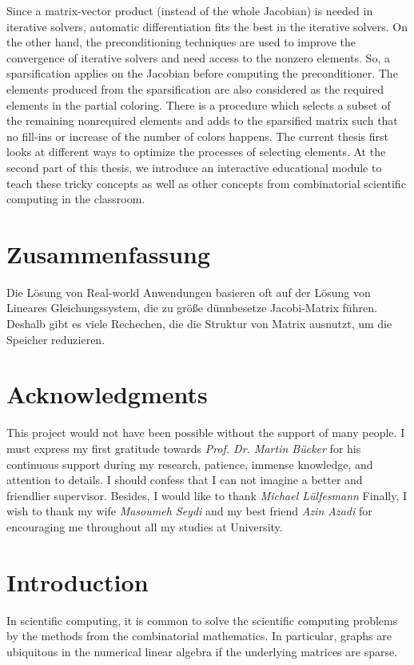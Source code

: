 \documentclass[12pt, twoside,a4paper,toc=bibliography]{scrbook}
\begin{document}
Since a matrix-vector product (instead of the whole Jacobian)
is needed in iterative solvers, automatic differentiation fits
the best in the iterative solvers.
On the other hand, the preconditioning techniques are used to improve the convergence of iterative solvers and need access to the nonzero elements. So, a sparsification applies on the Jacobian before computing the preconditioner. The elements produced from the sparsification are also considered as the required elements in the partial coloring.
There is a procedure which selects a subset of the remaining nonrequired elements and adds to the sparsified matrix such that no fill-ins or increase of the number of colors happens.
The current thesis first looks at different ways to optimize
the processes of selecting elements.
At the second part of this thesis, we introduce an interactive educational module to teach these
tricky concepts as well as other concepts from combinatorial scientific computing in the classroom.

\chapter*{Zusammenfassung}

Die Lösung von Real-world Anwendungen basieren oft auf der Lösung von Lineares Gleichungssystem,
die zu größe dünnbesetze Jacobi-Matrix führen. Deshalb gibt es viele Rechechen, die 
die Struktur von Matrix ausnutzt, um die Speicher reduzieren.


\chapter*{Acknowledgments}
\noindent This project would not have been possible without
the support of many people. I must express my first gratitude
towards \textit{Prof. Dr. Martin B\"ucker} for his continuous
support during my research, patience, immense knowledge,
and attention to details.
I should confess that I can not imagine a better and friendlier supervisor.
Besides, I would like to thank \textit{Michael Lülfesmann}
Finally, I wish to thank my wife \textit{Masoumeh Seydi} and
my best friend \textit{Azin Azadi} for encouraging me throughout all my studies at University.

\tableofcontents
\chapter{Introduction}
In scientific computing, it is common to solve the scientific computing problems by the methods from the combinatorial mathematics. In particular, graphs are ubiquitous in the numerical linear algebra if the underlying matrices are sparse. 
\end{document}
